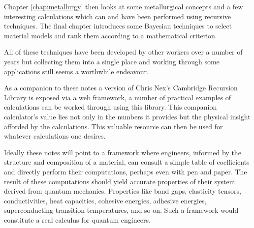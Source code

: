 Chapter \ref{chap:metallurgy} then looks at some metallurgical concepts 
and a few interesting calculations which can and have been performed 
using recursive techniques. The final chapter introduces some Bayesian 
techniques to select material models and rank them according 
to a mathematical criterion. 

All of these techniques have been developed by other workers 
over a number of years but collecting them into a single place 
and working through some applications still seems a worthwhile 
endeavour. 

As a companion to these notes a version of Chris Nex's Cambridge Recursion Library
is exposed via a web framework, a number of practical examples of calculations can
be worked through using this library. This companion calculator's value lies not only
in the numbers it provides but the physical insight afforded by the calculations.
This valuable resource can then be used for whatever calculations one desires.

Ideally these notes will point to a framework where engineers, informed by the
structure and composition of a material, can consult a simple table of
coefficients and directly perform their computations, perhaps even with 
pen and paper. The result of these computations should yield accurate 
properties of their system derived from quantum mechanics.
Properties like band gaps, elasticity tensors, conductivities, 
heat capacities, cohesive energies, adhesive energies, superconducting transition temperatures, 
and so on. Such a framework would constitute a real calculus for quantum engineers.

